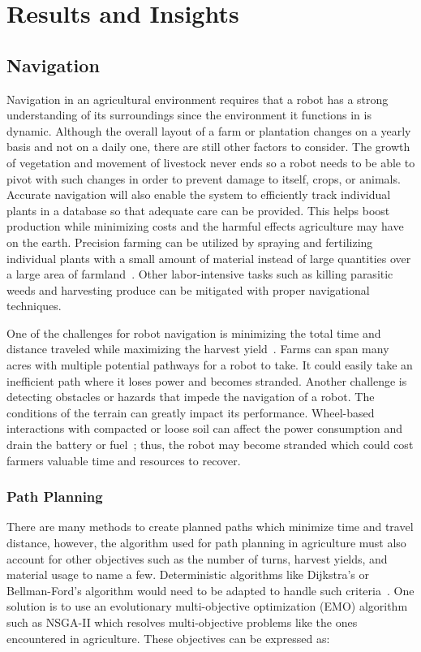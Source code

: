 \documentclass[12pt]{article}
\begin{document}
\section{Results and Insights}
\subsection{Navigation}
Navigation in an agricultural environment requires that a robot has a strong understanding of its surroundings since the environment it functions in is dynamic. Although the overall layout of a farm or plantation changes on a yearly basis and not on a daily one, there are still other factors to consider. The growth of vegetation and movement of livestock never ends so a robot needs to be able to pivot with such changes in order to prevent damage to itself, crops, or animals. Accurate navigation will also enable the system to efficiently track individual plants in a database so that adequate care can be provided. This helps boost production while minimizing costs and the harmful effects agriculture may have on the earth. Precision farming can be utilized by spraying and fertilizing individual plants with a small amount of material instead of large quantities over a large area of farmland~\cite{LEPEJ2016160}. Other labor-intensive tasks such as killing parasitic weeds and harvesting produce can be mitigated with proper navigational techniques.

One of the challenges for robot navigation is minimizing the total time and distance traveled while maximizing the harvest yield~\cite{MAHMUD2019488}. Farms can span many acres with multiple potential pathways for a robot to take. It could easily take an inefficient path where it loses power and becomes stranded. Another challenge is detecting obstacles or hazards that impede the navigation of a robot. The conditions of the terrain can greatly impact its performance. Wheel-based interactions with compacted or loose soil can affect the power consumption and drain the battery or fuel~\cite{REINA2017124}; thus, the robot may become stranded which could cost farmers valuable time and resources to recover.

\subsubsection{Path Planning}
There are many methods to create planned paths which minimize time and travel distance, however, the algorithm used for path planning in agriculture must also account for other objectives such as the number of turns, harvest yields, and material usage to name a few. Deterministic algorithms like Dijkstra's or Bellman-Ford's algorithm would need to be adapted to handle such criteria~\cite{MAHMUD2019488}. One solution is to use an evolutionary multi-objective optimization (EMO) algorithm such as NSGA-II which resolves multi-objective problems like the ones encountered in agriculture. These objectives can be expressed as:
\end{document}
